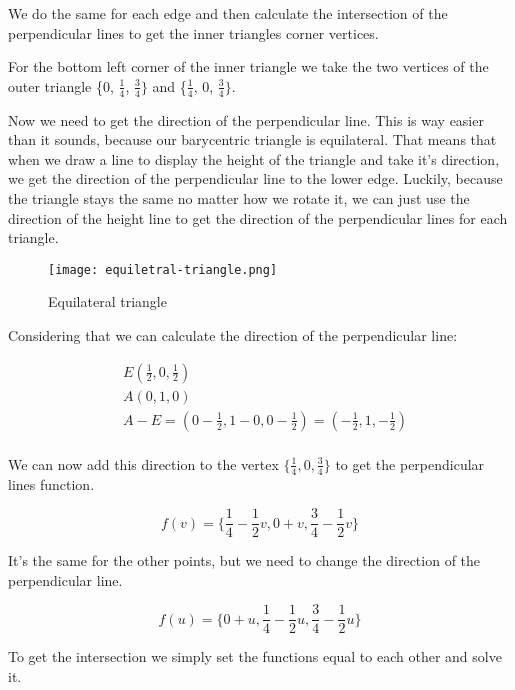\documentclass[12pt]{report} \usepackage{preamble}
\begin{document}
We do the same for each edge and then calculate the intersection of the
perpendicular lines to get the inner triangles corner vertices.

For the bottom left corner of the inner triangle we take the
two vertices of the outer triangle \{0, \(\frac{1}{4}\), \(\frac{3}{4}\}\)
and \{\(\frac{1}{4}\), 0, \(\frac{3}{4}\}\).

Now we need to get the direction of the perpendicular line.
This is way easier than it sounds, because our barycentric triangle is equilateral.
That means that when we draw a line to display the height of the triangle and take it's direction,
we get the direction of the perpendicular line to the lower edge.
Luckily, because the triangle stays the same no matter how we rotate it, we can just use
the direction of the height line to get the direction of the
perpendicular lines for each triangle. \cite{equilateral-triangle}

\begin{figure}[htbp]
	\centering \texttt{[image: equiletral-triangle.png]}
	\caption{Equilateral triangle}
	\cite{equilateral-triangle}
\end{figure} \floatbarrier

Considering that we can calculate the direction of the perpendicular line:

\[
	\begin{aligned}
		 & E(\frac{1}{2}, 0, \frac{1}{2})                                                      \\
		 & A(0, 1, 0)                                                                          \\
		 & A - E = (0 - \frac{1}{2}, 1 - 0, 0 - \frac{1}{2}) = (-\frac{1}{2}, 1, -\frac{1}{2}) \\
	\end{aligned}
\]

We can now add this direction to the vertex \(\{\frac{1}{4}, 0, \frac{3}{4}\}\)
to get the perpendicular lines function.

\[
	f(v) = \{\frac{1}{4} - \frac{1}{2}v, 0 + v, \frac{3}{4} - \frac{1}{2}v\}
\]

It's the same for the other points, but we need to change the direction of the perpendicular line.

\[
	f(u) = \{0+u, \frac{1}{4} - \frac{1}{2}u, \frac{3}{4} - \frac{1}{2}u\}
\]

To get the intersection we simply set the functions equal to each other and solve it.
\end{document}
